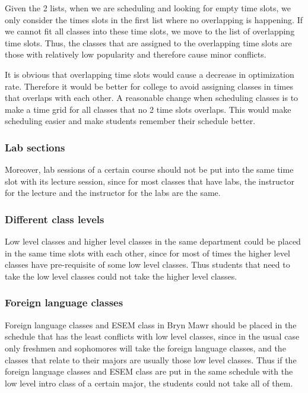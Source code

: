\documentclass[11pt, oneside]{article}   	%
\begin{document}
Given the 2 lists, when we are scheduling and looking for empty time slots, we only consider the times slots in the first list where no overlapping is happening. If we cannot fit all classes into these time slots, we move to the list of overlapping time slots. Thus, the classes that are assigned to the overlapping time slots are those with relatively low popularity and therefore cause minor conflicts.

It is obvious that overlapping time slots would cause a decrease in optimization rate. Therefore it would be better for college to avoid assigning classes in times that overlaps with each other. A reasonable change when scheduling classes is to make a time grid for all classes that no 2 time slots overlaps. This would make scheduling easier and make students remember their schedule better.

\subsubsection{Lab sections}
Moreover, lab sessions of a certain course should not be put into the same time slot with its lecture session, since for most classes that have labs, the instructor for the lecture and the instructor for the labs are the same.

\subsubsection{Different class levels}
Low level classes and higher level classes in the same department could be placed in the same time slots with each other, since for most of times the higher level classes have pre-requisite of some low level classes. Thus students that need to take the low level classes could not take the higher level classes.

\subsubsection{Foreign language classes}
Foreign language classes and ESEM class in Bryn Mawr should be placed in the schedule that has the least conflicts with low level classes, since in the usual case only freshmen and sophomores will take the foreign language classes, and the classes that relate to their majors are usually those low level classes. Thus if the foreign language classes and ESEM class are put in the same schedule with the low level intro class of a certain major, the students could not take all of them.
\end{document}
